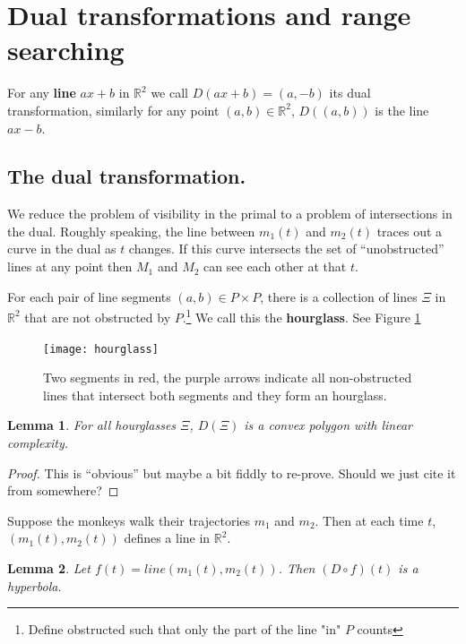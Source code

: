 \documentclass{article}
\newcommand{\patrick}[1]{\todo[color=purple!25!white]{Patrick: #1}\xspace}
\newtheorem{lemma}{Lemma}
\begin{document}
\section{Dual transformations and range searching}
For any \textbf{line} $ax + b$ in $\mathbb{R}^2$ we call $D(ax+b)=(a,-b)$ its dual transformation, similarly for any point $(a, b) \in \mathbb{R}^2$, $D((a, b))$ is the line $ax - b$.

\subsection{The dual transformation.}

We reduce the problem of visibility in the primal to a problem of intersections in the dual. Roughly speaking, the line between $m_1(t)$ and $m_2(t)$ traces out a curve in the dual as $t$ changes. If this curve intersects the set of ``unobstructed'' lines at any point then $M_1$ and $M_2$ can see each other at that $t$.

For each pair of line segments $(a,b) \in P \times P$, there is a collection of lines $\Xi$ in $\mathbb{R}^2$ that are not obstructed by $P$.\footnote{Define obstructed such that only the part of the line "in" $P$ counts} We call this the \textbf{hourglass}. See Figure \ref{fig:hourglass}

\begin{figure}[h]
  \centering
  \texttt{[image: hourglass]}
  \caption{Two segments in red, the purple arrows indicate all non-obstructed lines that intersect both segments and they form an hourglass.}
  \label{fig:hourglass}
\end{figure}

\begin{lemma}
    For all hourglasses $\Xi$, $D(\Xi)$ is a convex polygon with linear complexity. 
\end{lemma}

\begin{proof}
    This is ``obvious'' but maybe a bit fiddly to re-prove. Should we just cite it from somewhere?
    \patrick{What do you think?}
\end{proof}

Suppose the monkeys walk their trajectories $m_1$ and $m_2$. Then at each time $t$, $(m_1(t), m_2(t))$ defines a line in $\mathbb{R}^2$.

\begin{lemma}
  \label{lem:hyperbola}
  Let $f(t) = line(m_1(t), m_2(t))$. Then $(D \circ f)(t)$ is a hyperbola.
\end{lemma}
\end{document}
